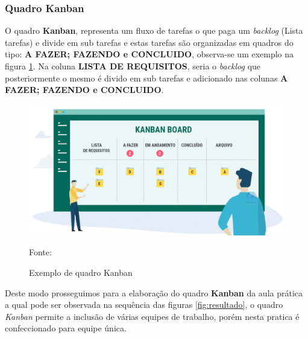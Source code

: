 \subsubsection{Quadro Kanban}
\par O quadro \textbf{Kanban}, representa um fluxo de tarefas o que paga um \textit{backlog} (Lista tarefas) e divide em sub tarefas e estas tarefas são organizadas em quadros do tipo: \textbf{A FAZER; FAZENDO e CONCLUIDO}, observa-se um exemplo na figura \ref{fig:kbn}. Na coluna \textbf{LISTA DE REQUISITOS}, seria o \textit{backlog} que posteriormente o mesmo é divido em sub tarefas e adicionado nas colunas \textbf{A FAZER; FAZENDO e CONCLUIDO}.

\begin{figure}[H] %
  \center
  \caption{Exemplo de quadro Kanban}

  \includegraphics[width=\textwidth]{figure/kbn.png}

  \raggedright
  {\fontsize{10pt}{\baselineskip}\selectfont Fonte: }
  \label{fig:kbn}
\end{figure}


\par Deste modo prosseguimos para a elaboração do quadro \textbf{Kanban} da aula prática a qual pode ser observada na sequência das figuras \ref{fig:resultado}, o quadro \textit{Kanban} permite a inclusão de várias equipes de trabalho, porém nesta pratica é confeccionado para equipe única.

